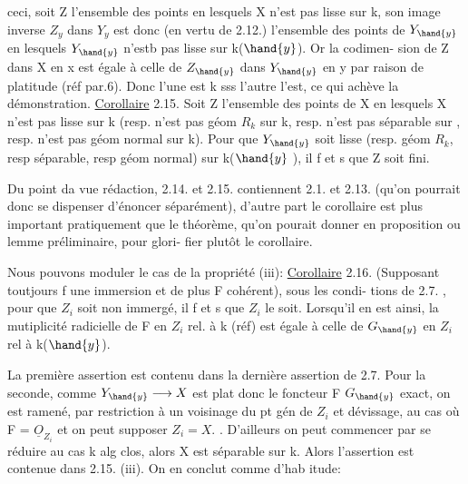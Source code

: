 
ceci, soit Z l'ensemble des points en lesquels X n'est pas lisse sur
k, son image inverse $Z_{y}$ dans $Y_{y}$ est donc (en vertu de 2.12.)   l'ensemble des
points de $Y_{\hand{y}}$ en lesquels $Y_{\hand{y}}$ n'estb pas lisse sur k($\hand{y}$). Or  la codimen-%
sion de  Z dans X en x  est égale à celle de  $Z_{\hand{y}}$ dans $Y_{\hand{y}}$  en y par
raison de platitude (réf par.6). Donc l'une est \hand{$>$}k  sss l'autre l'est,
ce qui achève la démonstration.
\uline{Corollaire} 2.15.   Soit Z l'ensemble des points de X en lesquels
X n'est pas lisse sur k (resp. n'est pas  géom $R_k$ sur k, resp. n'est
\placedmargin{\unsure{//}} pas séparable sur  , resp. n'est pas géom normal sur k). Pour que $Y_{\hand{y}}$ soit
lisse (resp.  géom $R_k$, resp séparable, resp géom normal) sur k($\hand{y}$ ), il
f et s  que Z soit fini.

\placedmargin{$|$} Du point da vue rédaction, 2.14. et 2.15.  contiennent 2.1. et
2.13. (qu'on pourrait donc se dispenser d'énoncer séparément), d'autre
part le corollaire est plus important pratiquement que le théorème,
qu'on pourait donner en proposition ou lemme préliminaire, pour glori-%
fier plutôt le corollaire.

Nous pouvons  moduler   le cas de la propriété (iii):
\uline{Corollaire} 2.16.  (Supposant toutjours f une immersion et de plus F cohérent), sous les condi-%
\placedmargin{\unsure{//}} tions de 2.7. , pour que $Z_i$ soit non immergé, il f et s que $Z_i$  le soit.
Lorsqu'il en est ainsi, la mutiplicité radicielle de F en $Z_i$  rel.
à k (réf) est égale à celle de $G_{\hand{y}}$  en $Z_i$  rel à k($\hand{y}$).

La première assertion est contenu dans la dernière assertion de
2.7. Pour la seconde, comme  $Y_{\hand{y}} \longrightarrow X$ est plat donc le foncteur F \hand{$\rightsquigarrow$} $G_{\hand{y}}$
exact,  on est ramené, par restriction à un voisinage du pt gén de $Z_i$
et dévissage, au cas où F = $\underline{O}_{Z_i}$ et on peut supposer $Z_i = X$. . D'ailleurs on peut commencer par
se réduire au cas k alg clos, alors X est séparable sur k. Alors  l'assertion  est
contenue dans 2.15. (iii).   On en conclut comme d'hab itude:

